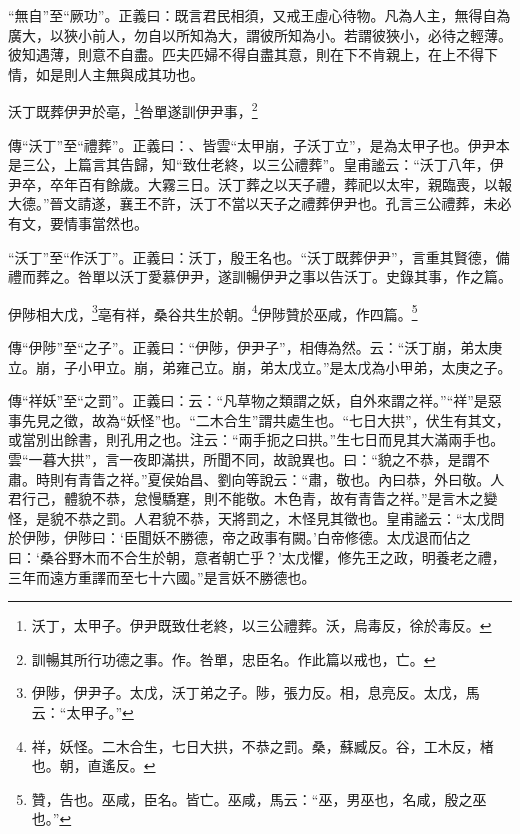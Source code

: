 {\noindent\shu{}\fzkt “無自”至“厥功”。正義曰：既言君民相須，又戒王虛心待物。凡為人主，無得自為廣大，以狹小前人，勿自以所知為大，謂彼所知為小。若謂彼狹小，必待之輕薄。彼知遇薄，則意不自盡。匹夫匹婦不得自盡其意，則在下不肯親上，在上不得下情，如是則人主無與成其功也。 \par}

沃丁既葬伊尹於亳，\footnote{沃丁，太甲子。伊尹既致仕老終，以三公禮葬。沃，烏毒反，徐於毒反。}咎單遂訓伊尹事，\footnote{訓暢其所行功德之事。作。咎單，忠臣名。作此篇以戒也，亡。}

{\noindent\zhuan{}\fzbyks 傳“沃丁”至“禮葬”。正義曰：、皆雲“太甲崩，子沃丁立”，是為太甲子也。伊尹本是三公，上篇言其告歸，知“致仕老終，以三公禮葬”。皇甫謐云：“沃丁八年，伊尹卒，卒年百有餘歲。大霧三日。沃丁葬之以天子禮，葬祀以太牢，親臨喪，以報大德。”晉文請遂，襄王不許，沃丁不當以天子之禮葬伊尹也。孔言三公禮葬，未必有文，要情事當然也。 \par}

{\noindent\shu{}\fzkt “沃丁”至“作沃丁”。正義曰：沃丁，殷王名也。“沃丁既葬伊尹”，言重其賢德，備禮而葬之。咎單以沃丁愛慕伊尹，遂訓暢伊尹之事以告沃丁。史錄其事，作之篇。 \par}

伊陟相大戊，\footnote{伊陟，伊尹子。太戊，沃丁弟之子。陟，張力反。相，息亮反。太戊，馬云：“太甲子。”}亳有祥，桑谷共生於朝。\footnote{祥，妖怪。二木合生，七日大拱，不恭之罰。桑，蘇臧反。谷，工木反，楮也。朝，直遙反。}伊陟贊於巫咸，作四篇。\footnote{贊，告也。巫咸，臣名。皆亡。巫咸，馬云：“巫，男巫也，名咸，殷之巫也。”}

{\noindent\zhuan{}\fzbyks 傳“伊陟”至“之子”。正義曰：“伊陟，伊尹子”，相傳為然。云：“沃丁崩，弟太庚立。崩，子小甲立。崩，弟雍己立。崩，弟太戊立。”是太戊為小甲弟，太庚之子。 \par}

{\noindent\zhuan{}\fzbyks 傳“祥妖”至“之罰”。正義曰：云：“凡草物之類謂之妖，自外來謂之祥。”“祥”是惡事先見之徵，故為“妖怪”也。“二木合生”謂共處生也。“七日大拱”，伏生有其文，或當別出餘書，則孔用之也。注云：“兩手扼之曰拱。”生七日而見其大滿兩手也。雲“一暮大拱”，言一夜即滿拱，所聞不同，故說異也。曰：“貌之不恭，是謂不肅。時則有青眚之祥。”夏侯始昌、劉向等說云：“肅，敬也。內曰恭，外曰敬。人君行己，體貌不恭，怠慢驕蹇，則不能敬。木色青，故有青眚之祥。”是言木之變怪，是貌不恭之罰。人君貌不恭，天將罰之，木怪見其徵也。皇甫謐云：“太戊問於伊陟，伊陟曰：‘臣聞妖不勝德，帝之政事有闕。’白帝修德。太戊退而佔之曰：‘桑谷野木而不合生於朝，意者朝亡乎？’太戊懼，修先王之政，明養老之禮，三年而遠方重譯而至七十六國。”是言妖不勝德也。 \par}

